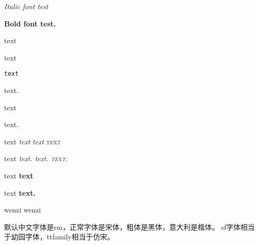 \documentclass{article}
\begin{document}
	
		\textit{Italic font test}
		
		{\bfseries Bold font test.}
		
		\textrm{text}
		
		\textsf{text}
		
		\texttt{text}
		
		\rmfamily text.
		
		\sffamily text
		
		\ttfamily text.
	
		\textup{text}
		\textit{text}
		\textsl{text}%
		\textsc{text} %
		
		\upshape text
		\itshape text.
		\slshape text.
		\scshape text.
		
		
		\textmd{text}
		\textbf{text}
		
		\mdseries text
		\bfseries text.
		
		
		\textnormal{wenzi}
		\normalfont wenzi
		
		
		
		默认中文字体是rm，正常字体是宋体，粗体是黑体，意大利是楷体。
		sf字体相当于幼园字体，ttfamily相当于仿宋。
		
		
		
	
\end{document}
